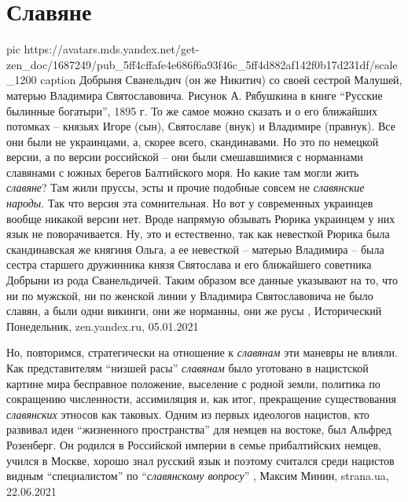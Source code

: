  
 
 
 
 
\chapter{Славяне}
\label{sec:slova.slavjane}

\ifcmt
  pic https://avatars.mds.yandex.net/get-zen_doc/1687249/pub_5ff4cffafe4e686f6a93f46c_5ff4d882af142f0b17d231df/scale_1200
	caption Добрыня Сванельдич (он же Никитич) со своей сестрой Малушей, матерью Владимира Святославовича. Рисунок А. Рябушкина в книге \enquote{Русские былинные богатыри}, 1895 г.
\fi
То же самое можно сказать и о его ближайших потомках – князьях Игоре (сын),
Святославе (внук) и Владимире (правнук). Все они были не украинцами, а, скорее
всего, скандинавами. Но это по немецкой версии, а по версии российской – они
были смешавшимися с норманнами славянами с южных берегов Балтийского моря. Но
какие там могли жить \emph{славяне}? Там жили пруссы, эсты и прочие подобные
совсем не \emph{славянские народы}. Так что версия эта сомнительная.  Но вот у
современных украинцев вообще никакой версии нет. Вроде напрямую обзывать Рюрика
украинцем у них язык не поворачивается. Ну, это и естественно, так как
невесткой Рюрика была скандинавская же княгиня Ольга, а ее невесткой – матерью
Владимира – была сестра старшего дружинника князя Святослава и его ближайшего
советника Добрыни из рода Сванельдичей. Таким образом все данные указывают на
то, что ни по мужской, ни по женской линии у Владимира Святославовича не было
славян, а были одни викинги, они же норманны, они же русы
,
Исторический Понедельник, zen.yandex.ru, 05.01.2021 

Но, повторимся, стратегически на отношение к \emph{славянам} эти маневры не влияли.
Как представителям \enquote{низшей расы} \emph{славянам} было уготовано в нацистской картине
мира бесправное положение, выселение с родной земли, политика по сокращению
численности, ассимиляция и, как итог, прекращение существования \emph{славянских}
этносов как таковых. Одним из первых идеологов нацистов, кто развивал идеи
\enquote{жизненного пространства} для немцев на востоке, был Альфред Розенберг. Он
родился в Российской империи в семье прибалтийских немцев, учился в Москве,
хорошо знал русский язык и поэтому считался среди нацистов видным
\enquote{специалистом} по \enquote{\emph{славянскому вопросу}}
, 
Максим Минин, strana.ua, 22.06.2021

